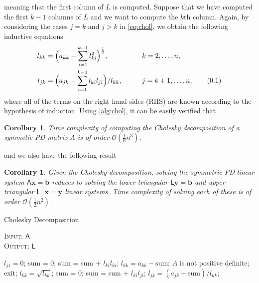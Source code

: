 \documentclass[10pt]{article}
\newtheorem{cor}[thm]{Corollary}
\theoremstyle{definition}
\theoremstyle{definition}
\theoremstyle{remark}
\newcommand\eqnum{\addtocounter{equation}{1}\tag{\arabic{section}.\arabic{equation}}}
\begin{document}
meaning that the first column of $L$ is computed. Suppose that we have computed the first $k-1$ columns of $L$ and we want to compute the $k$th column. Again, by considering the cases $j=k$ and $j>k$ in \cref{eq:chol}, we obtain the following inductive equations
\begin{alignat*}{2}
l_{kk} &= \Big(a_{kk} - \sum_{i=1}^{k-1}l_{ki}^2\Big)^{\frac{1}{2}}, && k=2,\dots,n, \\ 
l_{jk} &= \Big(a_{jk}-\sum_{i=1}^{k-1}l_{ki}l_{ji}\Big)/l_{kk}, \qquad && j = k+1,\dots, n,
\eqnum
\label{eq:chol:alg}
\end{alignat*}
where all of the terms on the right hand sides (RHS) are known according to the hypothesis of induction. Using \cref{alg:chol}, it can be easily verified that
\begin{cor}
Time complexity of computing the Cholesky decomposition of a symmetic PD matrix $A$ is of order $\mathcal{O}(\frac{1}{6}n^3)$.
\end{cor}
\noindent
and we also have the following result
\begin{cor}
Given the Cholesky decomposition, solving the symmetric PD linear system $\mathsf{A}\mathbf{x}=\mathbf{b}$ reduces to solving the lower-triangular $\mathsf{L}\mathbf{y} = \mathbf{b}$ and upper-triangular $\mathsf{L}^{\top} \mathbf{x} = \mathbf{y}$  linear systems. Time complexity of solving each of these is of order $\mathcal{O}(\frac{1}{2}n^2)$.
\end{cor}

\begin{algorithm}[t]
\caption{Cholesky Decomposition}\label{alg:chol}
\hspace*{\algorithmicindent} {\scshape Input}: $\mathsf{A}$\\
\hspace*{\algorithmicindent} {\scshape Output}: $\mathsf{L}$
\begin{algorithmic}[1]
	\State $l_{j1} = 0$;
\EndFor
{}
	\State sum = $0$;
		\State sum = sum + $l_{ki}l_{ki}$;
	\EndFor
	\State $l_{kk} = a_{kk}- \text{sum}$;
		\State $A$ is not positive definite;
		\State exit;
	\Else
		\State $l_{kk} = \sqrt{l_{kk}}$;
	\EndIf
\EndFor
{}
	\State sum = $0$;
		\State sum = sum + $l_{ki}l_{ji}$;
	\EndFor
	\State $l_{jk}=(a_{jk}-\text{sum})/l_{kk}$;
\EndFor
\end{algorithmic}
\end{algorithm}
\end{document}
